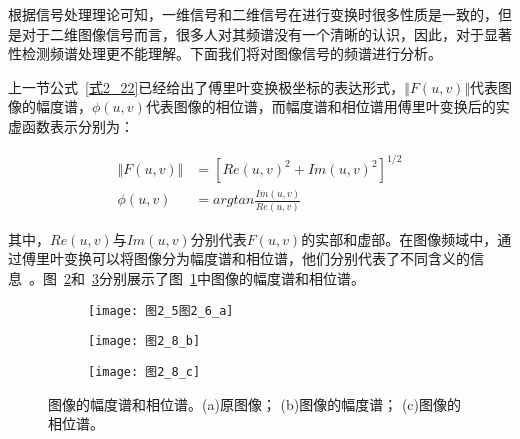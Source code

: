 根据信号处理理论可知，一维信号和二维信号在进行变换时很多性质是一致的，但是对于二维图像信号而言，很多人对其频谱没有一个清晰的认识，因此，对于显著性检测频谱处理更不能理解。下面我们将对图像信号的频谱进行分析。

上一节公式~\ref{式2_22}已经给出了傅里叶变换极坐标的表达形式，$\Vert F(u,v)\Vert$代表图像的幅度谱，$\phi(u,v)$代表图像的相位谱，而幅度谱和相位谱用傅里叶变换后的实虚函数表示分别为：
\begin{linenomath}
\begin{align}
\Vert F(u,v)\Vert &= [Re(u,v)^{2}+Im(u,v)^{2}]^{1/2}\label{式2_35}\\
\phi(u,v) &= arg tan\frac{Im(u,v)}{Re(u,v)}\label{式2_36}
\end{align}
\end{linenomath}
其中，$Re(u,v)$与$Im(u,v)$分别代表$F(u,v)$的实部和虚部。在图像频域中，通过傅里叶变换可以将图像分为幅度谱和相位谱，他们分别代表了不同含义的信息~\cite{ZhangRuolan2002frequency}。图~\ref{图2_8_b}和~\ref{图2_8_c}分别展示了图~\ref{图2_8_a}中图像的幅度谱和相位谱。
\begin{figure}[h]
  \centering%
  \begin{subfigure}{3cm}
    \texttt{[image: 图2\_5图2\_6\_a]}
    \caption{}
    \label{图2_8_a}
  \end{subfigure}
  \hspace{4em}%
  \begin{subfigure}{0.2\textwidth}
    \texttt{[image: 图2\_8\_b]}
    \caption{}
    \label{图2_8_b}
  \end{subfigure}
  \hspace{4em}%
  \begin{subfigure}{0.25\textwidth}
    \texttt{[image: 图2\_8\_c]}
    \caption{}
    \label{图2_8_c}
  \end{subfigure}
  \caption{图像的幅度谱和相位谱。(a)原图像； (b)图像的幅度谱； (c)图像的相位谱。}
  \label{图2_8}
\end{figure}

